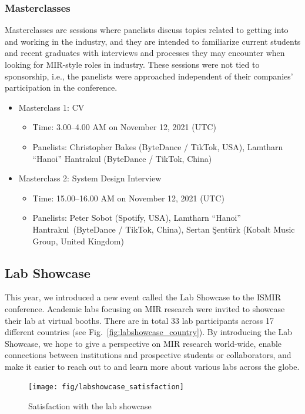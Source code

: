 \documentclass[%
10pt,								%
titlepage,						%
]
{scrartcl}
\begin{document}
        \subsubsection{Masterclasses}
            Masterclasses are sessions where panelists discuss topics related to getting into and working in the industry, and they are intended to familiarize current students and recent graduates with interviews and processes they may encounter when looking for MIR-style roles in industry. These sessions were not tied to sponsorship, i.e., the panelists were approached independent of their companies' participation in the conference.
             \begin{itemize}
                \item Masterclass 1: CV
                    \begin{itemize}
                        \item   Time: 3.00--4.00 AM on November 12, 2021 (UTC)
                        \item   Panelists: Christopher Bakes (ByteDance / TikTok, USA), Lamtharn ``Hanoi'' Hantrakul (ByteDance / TikTok, China)
                    \end{itemize}
                \item Masterclass 2: System Design Interview
                    \begin{itemize}
                        \item   Time: 15.00--16.00 AM on November 12, 2021 (UTC)
                        \item   Panelists: Peter Sobot (Spotify, USA), Lamtharn ``Hanoi'' Hantrakul~(ByteDance / TikTok, China), Sertan \c{S}ent\"urk (Kobalt Music Group, United Kingdom)
                    \end{itemize}
            \end{itemize}
        
    \subsection{Lab Showcase}
        This year, we introduced a new event called the Lab Showcase to the ISMIR conference. Academic labs focusing on MIR research were invited to showcase their lab at virtual booths. There are in total 33 lab participants across 17 different countries (see Fig.~\ref{fig:labshowcase_country}). By introducing the Lab Showcase, we hope to give a perspective on MIR research world-wide, enable connections between institutions and prospective students or collaborators, and make it easier to reach out to and learn more about various labs across the globe.
        \begin{figure}%
            \centering
            \texttt{[image: fig/labshowcase\_satisfaction]}%
            \caption{Satisfaction with the lab showcase}%
            \label{fig:labshowcase_satisfaction}%
        \end{figure}
        
\end{document}
